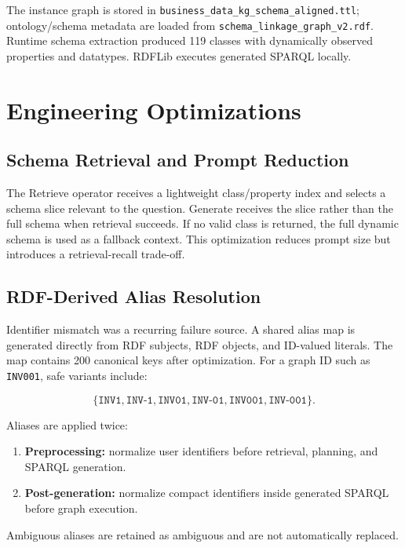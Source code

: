 \documentclass[11pt]{article}
\begin{document}
The instance graph is stored in \texttt{business\_data\_kg\_schema\_aligned.ttl}; ontology/schema metadata are loaded from \texttt{schema\_linkage\_graph\_v2.rdf}. Runtime schema extraction produced 119 classes with dynamically observed properties and datatypes. RDFLib executes generated SPARQL locally.

\section{Engineering Optimizations}

\subsection{Schema Retrieval and Prompt Reduction}

The Retrieve operator receives a lightweight class/property index and selects a schema slice relevant to the question. Generate receives the slice rather than the full schema when retrieval succeeds. If no valid class is returned, the full dynamic schema is used as a fallback context. This optimization reduces prompt size but introduces a retrieval-recall trade-off.

\subsection{RDF-Derived Alias Resolution}

Identifier mismatch was a recurring failure source. A shared alias map is generated directly from RDF subjects, RDF objects, and ID-valued literals. The map contains 200 canonical keys after optimization. For a graph ID such as \texttt{INV001}, safe variants include:

\[
\{\texttt{INV1},\texttt{INV-1},\texttt{INV01},\texttt{INV-01},
\texttt{INV001},\texttt{INV-001}\}.
\]

Aliases are applied twice:

\begin{enumerate}[leftmargin=*]
    \item \textbf{Preprocessing:} normalize user identifiers before retrieval, planning, and SPARQL generation.
    \item \textbf{Post-generation:} normalize compact identifiers inside generated SPARQL before graph execution.
\end{enumerate}

Ambiguous aliases are retained as ambiguous and are not automatically replaced.
\end{document}
